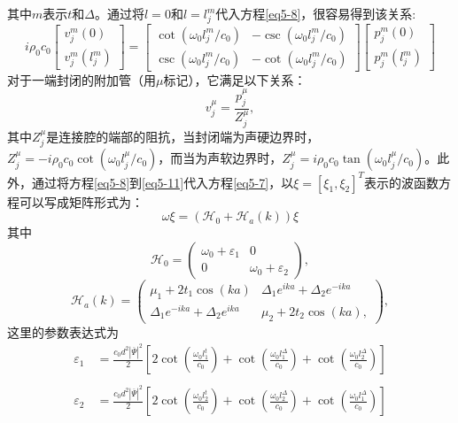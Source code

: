 其中$m$表示$t$和$\Delta$。通过将$l = 0$和$l = l_j^m$代入方程\ref{eq5-8}，很容易得到该关系:
\begin{equation}\label{eq5-10}
    i\rho_0 c_0\begin{bmatrix}v_j^m(0)\\v_j^m(l_j^m)\end{bmatrix}=\begin{bmatrix}\cot(\omega_0 l_j^m / c_0)&-\csc(\omega_0 l_j^m / c_0)\\\csc(\omega_0 l_j^m / c_0)&-\cot(\omega_0 l_j^m / c_0)\end{bmatrix}\begin{bmatrix}p_j^m(0)\\p_j^m(l_j^m)\end{bmatrix}
\end{equation}
对于一端封闭的附加管（用$\mu$标记），它满足以下关系：
\begin{equation}\label{eq5-11}
    v_j^{\mu} = \frac{p_j^{\mu}}{Z_j^{\mu}},
\end{equation}
其中$Z_j^{\mu}$是连接腔的端部的阻抗，当封闭端为声硬边界时，$Z_j^{\mu} = -i\rho_0 c_0\cot(\omega_0 l_j^{\mu} / c_0)$，而当为声软边界时，$Z_j^{\mu} = i\rho_0 c_0\tan(\omega_0 l_j^{\mu} / c_0)$。此外，通过将方程\ref{eq5-8}到\ref{eq5-11}代入方程\ref{eq5-7}，以$\xi = [\xi_1,\xi_2]^T$表示的波函数方程可以写成矩阵形式为：
\begin{equation}\label{eq5-12}
    \omega \xi = (\mathcal{H}_0 + \mathcal{H}_a(k))\xi
\end{equation}
其中
\begin{equation}\label{eq5-13}
    \mathcal{H}_0 = 
    \begin{pmatrix}
    \omega_0 + \varepsilon_1 & 0 \\
    0 & \omega_0 + \varepsilon_2
    \end{pmatrix},
\end{equation}
\begin{equation}\label{eq5-14}
    \mathcal{H}_a(k) =
    \begin{pmatrix}
        \mu_1 + 2t_1\cos(ka) & \Delta_1 e^{ika} + \Delta_2 e^{-ika} \\
        \Delta_1 e^{-ika} + \Delta_2 e^{ika} & \mu_2 + 2t_2\cos(ka),
    \end{pmatrix},
\end{equation}
这里的参数表达式为
\begin{equation}\label{eq5-15}
    \begin{split}
    \varepsilon_1 &= \frac{c_0d^2|\overline{\Psi}|^2}{2}\left[2\cot\left(\frac{\omega_0l_1^t}{c_0}\right) + \cot\left(\frac{\omega_0l_1^{\Delta}}{c_0}\right) + \cot\left(\frac{\omega_0l_2^{\Delta}}{c_0}\right)\right] \\ \quad \\
    \varepsilon_2 &= \frac{c_0d^2|\overline{\Psi}|^2}{2}\left[2\cot\left(\frac{\omega_0l_2^t}{c_0}\right) + \cot\left(\frac{\omega_0l_2^{\Delta}}{c_0}\right) + \cot\left(\frac{\omega_0l_1^{\Delta}}{c_0}\right)\right]
    \end{split}
\end{equation}
    
